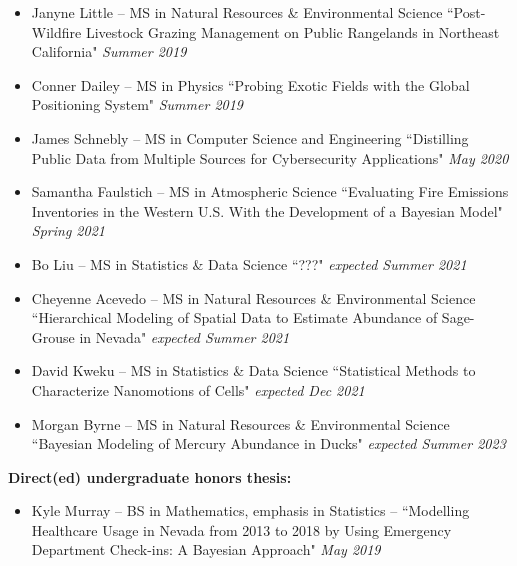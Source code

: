 \documentclass[paper=a4,fontsize=11pt]{scrartcl} %
\newcommand{\ThesisEntry}[5]{
		\noindent #1 -- #2 #3 ``#4" \textit{#5}}
\begin{document}
  \begin{itemize}[noitemsep]
    

\item \ThesisEntry{Janyne Little}{MS in Natural Resources \& Environmental Science}{}{Post-Wildfire Livestock Grazing Management on Public Rangelands in Northeast California}{Summer 2019}

  \item \ThesisEntry{Conner Dailey}{MS in Physics}{}{Probing Exotic Fields with the Global Positioning System}{Summer 2019}

  \item \ThesisEntry{James Schnebly}{MS in Computer Science and Engineering}{}{Distilling Public Data from Multiple Sources for Cybersecurity Applications}{May 2020}

  \item \ThesisEntry{Samantha Faulstich}{MS in Atmospheric Science}{}{Evaluating Fire Emissions Inventories in the Western U.S. With the Development of a Bayesian Model}{Spring 2021}

  \item \ThesisEntry{Bo Liu}{MS in Statistics \& Data Science}{}{???}{expected Summer 2021}
    
  \item \ThesisEntry{Cheyenne Acevedo}{MS in Natural Resources \& Environmental Science}{}{Hierarchical Modeling of Spatial Data to Estimate Abundance of Sage-Grouse in Nevada}{expected Summer 2021}

  \item \ThesisEntry{David Kweku}{MS in Statistics \& Data Science}{}{Statistical Methods to Characterize Nanomotions of Cells}{expected Dec 2021}
    
  \item \ThesisEntry{Morgan Byrne}{MS in Natural Resources \& Environmental Science}{}{Bayesian Modeling of Mercury Abundance in Ducks}{expected Summer 2023}

  \end{itemize}

    \noindent \textbf{Direct(ed) undergraduate honors thesis:}

    \begin{itemize}[noitemsep]
      
    \item \ThesisEntry{Kyle Murray}{BS in Mathematics, emphasis in Statistics}{--}{Modelling Healthcare Usage in Nevada from 2013 to 2018 by Using Emergency Department Check-ins: A Bayesian Approach}{May 2019}
      

  \end{itemize}
  
\end{document}
